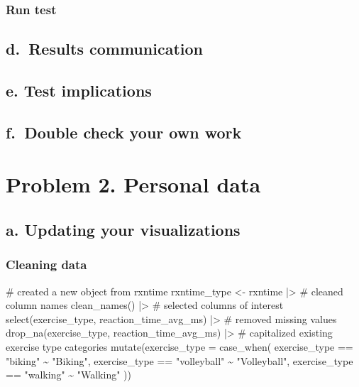 \documentclass[
  letterpaper,
  DIV=11,
  numbers=noendperiod]{scrartcl}
\newenvironment{Shaded}{\begin{snugshade}}{\end{snugshade}}
\newcommand{\AttributeTok}[1]{\textcolor[rgb]{0.40,0.45,0.13}{#1}}
\newcommand{\CommentTok}[1]{\textcolor[rgb]{0.37,0.37,0.37}{#1}}
\newcommand{\FunctionTok}[1]{\textcolor[rgb]{0.28,0.35,0.67}{#1}}
\newcommand{\NormalTok}[1]{\textcolor[rgb]{0.00,0.23,0.31}{#1}}
\newcommand{\OtherTok}[1]{\textcolor[rgb]{0.00,0.23,0.31}{#1}}
\newcommand{\SpecialCharTok}[1]{\textcolor[rgb]{0.37,0.37,0.37}{#1}}
\newcommand{\StringTok}[1]{\textcolor[rgb]{0.13,0.47,0.30}{#1}}
\begin{document}
\subsubsection{Run test}\label{run-test}

\subsection{d.~Results communication}\label{d.-results-communication}

\subsection{e. Test implications}\label{e.-test-implications}

\subsection{f.~Double check your own
work}\label{f.-double-check-your-own-work}

\section{Problem 2. Personal data}\label{problem-2.-personal-data}

\subsection{a. Updating your
visualizations}\label{a.-updating-your-visualizations}

\subsubsection{Cleaning data}\label{cleaning-data}

\begin{Shaded}
\begin{Highlighting}[]
\CommentTok{\# created a new object from rxntime}
\NormalTok{rxntime\_type }\OtherTok{\textless{}{-}}\NormalTok{ rxntime }\SpecialCharTok{|\textgreater{}} 
  \CommentTok{\# cleaned column names}
 \FunctionTok{clean\_names}\NormalTok{() }\SpecialCharTok{|\textgreater{}} 
  \CommentTok{\# selected columns of interest}
  \FunctionTok{select}\NormalTok{(exercise\_type, reaction\_time\_avg\_ms) }\SpecialCharTok{|\textgreater{}} 
  \CommentTok{\# removed missing values}
  \FunctionTok{drop\_na}\NormalTok{(exercise\_type, reaction\_time\_avg\_ms) }\SpecialCharTok{|\textgreater{}} 
  \CommentTok{\# capitalized existing exercise type categories}
  \FunctionTok{mutate}\NormalTok{(}\AttributeTok{exercise\_type =} \FunctionTok{case\_when}\NormalTok{(}
\NormalTok{    exercise\_type }\SpecialCharTok{==} \StringTok{"biking"} \SpecialCharTok{\textasciitilde{}} \StringTok{"Biking"}\NormalTok{,}
\NormalTok{    exercise\_type }\SpecialCharTok{==} \StringTok{"volleyball"} \SpecialCharTok{\textasciitilde{}} \StringTok{"Volleyball"}\NormalTok{,}
\NormalTok{    exercise\_type }\SpecialCharTok{==} \StringTok{"walking"} \SpecialCharTok{\textasciitilde{}} \StringTok{"Walking"}
\NormalTok{  ))}
\end{Highlighting}
\end{Shaded}
\end{document}
